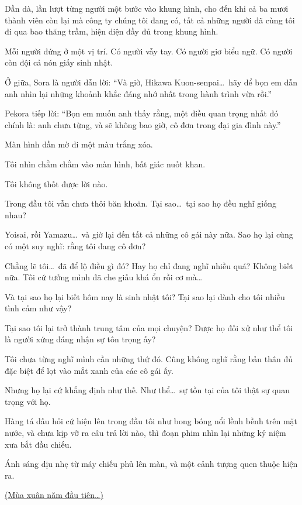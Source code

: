 \documentclass[../main.tex]{subfiles}
\begin{document}
Dần dà,  lần lượt từng người một bước vào khung hình, cho đến khi cả ba mươi thành viên còn lại mà công ty chúng tôi đang có, tất cả những người đã cùng tôi đi qua bao thăng trầm, hiện diện đầy đủ trong khung hình.

Mỗi người đứng ở một vị trí. Có người vẫy tay. Có người giơ biểu ngữ. Có người còn đội cả nón giấy sinh nhật.

Ở giữa, Sora là người dẫn lời: ``Và giờ, Hikawa Kuon-senpai\dots\ hãy để bọn em dẫn anh nhìn lại những khoảnh khắc đáng nhớ nhất trong hành trình vừa rồi.''

Pekora tiếp lời: ``Bọn em muốn anh thấy rằng, một điều quan trọng nhất đó chính là: anh chưa từng, và sẽ không bao giờ, cô đơn trong đại gia đình này.''

Màn hình dần mờ đi một màu trắng xóa.

Tôi nhìn chằm chằm vào màn hình, bất giác nuốt khan.

Tôi không thốt được lời nào.

Trong đầu tôi vẫn chưa thôi băn khoăn. Tại sao\dots\ tại sao họ đều nghĩ giống nhau?

Yoisai, rồi Yamazu\dots\ và giờ lại đến tất cả những cô gái này nữa. Sao họ lại cùng có một suy nghĩ: rằng tôi đang cô đơn?

Chẳng lẽ tôi\dots\ đã để lộ điều gì đó? Hay họ chỉ đang nghĩ nhiều quá? Không biết nữa. Tôi cứ tưởng mình đã che giấu khá ổn rồi cơ mà\dots

Và tại sao họ lại biết hôm nay là sinh nhật tôi? Tại sao lại dành cho tôi nhiều tình cảm như vậy?

Tại sao tôi lại trở thành trung tâm của mọi chuyện? Được họ đối xử như thể tôi là người xứng đáng nhận sự tôn trọng ấy?

Tôi chưa từng nghĩ mình cần những thứ đó. Cũng không nghĩ rằng bản thân đủ đặc biệt để lọt vào mắt xanh của các cô gái ấy.

Nhưng họ lại cứ khẳng định như thế. Như thể\dots\ sự tồn tại của tôi thật sự quan trọng với họ.

Hàng tá dấu hỏi cứ hiện lên trong đầu tôi như bong bóng nổi lềnh bềnh trên mặt nước, và chưa kịp vỡ ra câu trả lời nào, thì đoạn phim nhìn lại những kỷ niệm xưa bắt đầu chiếu.

\ct

Ánh sáng dịu nhẹ từ máy chiếu phủ lên màn, và một cảnh tượng quen thuộc hiện ra.

\begin{center}
    \uline{(Mùa xuân năm đầu tiên\dots)}
\end{center}
\end{document}
